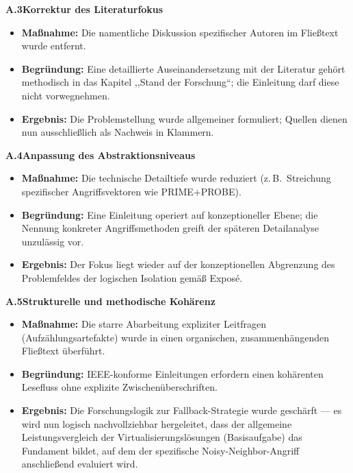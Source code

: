 \documentclass[conference]{IEEEtran}
\begin{document}
\bigskip
\noindent\textbf{A.3\quad Korrektur des Literaturfokus}

\begin{itemize}
  \item \textbf{Maßnahme:} Die namentliche Diskussion spezifischer Autoren
        im Fließtext wurde entfernt.
  \item \textbf{Begründung:} Eine detaillierte Auseinandersetzung mit der
        Literatur gehört methodisch in das Kapitel ,,Stand der Forschung``;
        die Einleitung darf diese nicht vorwegnehmen.
  \item \textbf{Ergebnis:} Die Problemstellung wurde allgemeiner formuliert;
        Quellen dienen nun ausschließlich als Nachweis in Klammern.
\end{itemize}

\bigskip
\noindent\textbf{A.4\quad Anpassung des Abstraktionsniveaus}

\begin{itemize}
  \item \textbf{Maßnahme:} Die technische Detailtiefe wurde reduziert
        (z.\,B.\ Streichung spezifischer Angriffsvektoren wie PRIME+PROBE).
  \item \textbf{Begründung:} Eine Einleitung operiert auf konzeptioneller
        Ebene; die Nennung konkreter Angriffsmethoden greift der späteren
        Detailanalyse unzulässig vor.
  \item \textbf{Ergebnis:} Der Fokus liegt wieder auf der konzeptionellen
        Abgrenzung des Problemfeldes der logischen Isolation gemäß Exposé.
\end{itemize}

\bigskip
\noindent\textbf{A.5\quad Strukturelle und methodische Kohärenz}

\begin{itemize}
  \item \textbf{Maßnahme:} Die starre Abarbeitung expliziter Leitfragen
        (Aufzählungsartefakte) wurde in einen organischen, zusammenhängenden
        Fließtext überführt.
  \item \textbf{Begründung:} IEEE-konforme Einleitungen erfordern einen
        kohärenten Lesefluss ohne explizite Zwischenüberschriften.
  \item \textbf{Ergebnis:} Die Forschungslogik zur Fallback-Strategie wurde
        geschärft --- es wird nun logisch nachvollziehbar hergeleitet, dass
        der allgemeine Leistungsvergleich der Virtualisierungslösungen
        (Basisaufgabe) das Fundament bildet, auf dem der spezifische
        Noisy-Neighbor-Angriff anschließend evaluiert wird.
\end{itemize}
\end{document}
